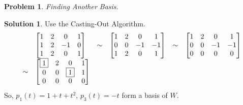 \documentclass{article}
\newtheorem{problem}{Problem}
\theoremstyle{definition}
\newtheorem*{solution}{Solution}
\begin{document}
\begin{problem}

Finding Another Basis.

\end{problem}

\begin{solution}

Use the Casting-Out Algorithm.
\[
\begin{array}{r l r l r l}
& \begin{bmatrix}
1 & 2 & 0 & 1 \\
1 & 2 & -1 & 0 \\
1 & 2 & 0 & 1
\end{bmatrix}
& \sim & \begin{bmatrix}
1 & 2 & 0 & 1 \\
0 & 0 & -1 & -1 \\
1 & 2 & 0 & 1
\end{bmatrix}
& \sim & \begin{bmatrix}
1 & 2 & 0 & 1 \\
0 & 0 & -1 & -1 \\
0 & 0 & 0 & 0
\end{bmatrix} \\
\sim & \begin{bmatrix}
\boxed{1} & 2 & 0 & 1 \\
0 & 0 & \boxed{1} & 1 \\
0 & 0 & 0 & 0
\end{bmatrix}
\end{array}
\]
So, $p_1(t)=1+t+t^2$, $p_3(t)=-t$ form a basis of $W$.

\end{solution}
\end{document}
